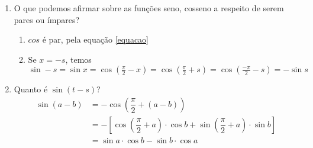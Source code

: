 \documentclass[english,ngerman,parskip=half]{scrartcl}
\begin{document}
\begin{enumerate}[label=\textnormal{(\arabic*)}]
    \item O que podemos afirmar sobre as funções seno, cosseno a respeito de serem pares ou ímpares?
        \begin{enumerate}
            \item $cos$ é par, pela equação \ref{equacao}
            \item Se $x = -s$, temos \\
                $\sin -s = \sin x = \cos(  - x) = \cos ( + s) = \cos ( - s) = -\sin s $
        \end{enumerate}
    \item Quanto é $\sin(t-s)$?
        \begin{align}
            \sin (a - b) &=- \cos\left(\dfrac{\pi}{2} + ( a - b )\right) \\
                         &=- \left[ \cos\left(\dfrac{\pi}{2} + a\right) \cdot \cos b + \sin\left(\dfrac{\pi}{2} + a\right) \cdot \sin b \right] \\
                         &= \sin a \cdot \cos b - \sin b \cdot \cos a
        \end{align}
\end{enumerate}
\end{document}
